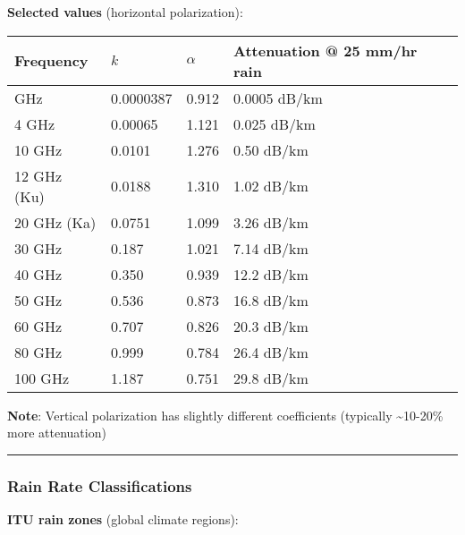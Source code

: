 \textbf{Selected values} (horizontal polarization):

{\def\LTcaptype{} %
\begin{longtable}[]{@{}llll@{}}
\toprule\noalign{}
Frequency & \(k\) & \(\alpha\) & Attenuation @ 25 mm/hr rain \\
\midrule\noalign{}
\endhead
\bottomrule\noalign{}
\endlastfoot
1 GHz & 0.0000387 & 0.912 & 0.0005 dB/km \\
4 GHz & 0.00065 & 1.121 & 0.025 dB/km \\
10 GHz & 0.0101 & 1.276 & 0.50 dB/km \\
12 GHz (Ku) & 0.0188 & 1.310 & 1.02 dB/km \\
20 GHz (Ka) & 0.0751 & 1.099 & 3.26 dB/km \\
30 GHz & 0.187 & 1.021 & 7.14 dB/km \\
40 GHz & 0.350 & 0.939 & 12.2 dB/km \\
50 GHz & 0.536 & 0.873 & 16.8 dB/km \\
60 GHz & 0.707 & 0.826 & 20.3 dB/km \\
80 GHz & 0.999 & 0.784 & 26.4 dB/km \\
100 GHz & 1.187 & 0.751 & 29.8 dB/km \\
\end{longtable}
}

\textbf{Note}: Vertical polarization has slightly different coefficients
(typically \textasciitilde10-20\% more attenuation)

\begin{center}\rule{0.5\linewidth}{0.5pt}\end{center}

\subsubsection{Rain Rate
Classifications}\label{rain-rate-classifications}

\textbf{ITU rain zones} (global climate regions):

